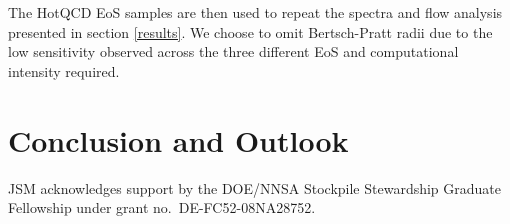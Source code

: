 \documentclass[aps,prc,reprint,amsmath,nofootinbib,superscriptaddress]{revtex4-1}
\begin{document}
The HotQCD EoS samples are then used to repeat the spectra and flow analysis presented in section \ref{results}. 
We choose to omit Bertsch-Pratt radii due to the low sensitivity observed across the three different EoS and computational intensity required.

\section{Conclusion and Outlook}

\begin{acknowledgments}
 JSM acknowledges support by the DOE/NNSA Stockpile Stewardship Graduate Fellowship under grant no.~DE-FC52-08NA28752.
\end{acknowledgments}


\end{document}
